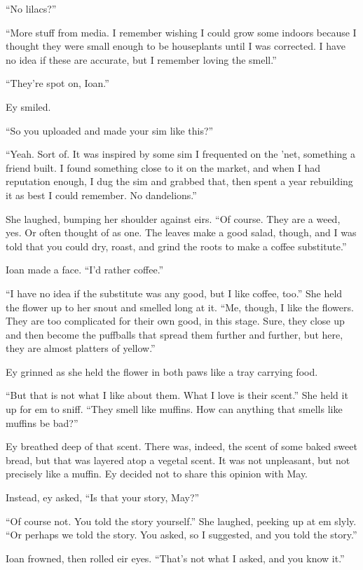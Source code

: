 ``No lilacs?''

``More stuff from media. I remember wishing I could grow some indoors because I thought they were small enough to be houseplants until I was corrected. I have no idea if these are accurate, but I remember loving the smell.''

``They're spot on, Ioan.''

Ey smiled.

``So you uploaded and made your sim like this?''

``Yeah. Sort of. It was inspired by some sim I frequented on the 'net, something a friend built. I found something close to it on the market, and when I had reputation enough, I dug the sim and grabbed that, then spent a year rebuilding it as best I could remember. No dandelions.''

She laughed, bumping her shoulder against eirs. ``Of course. They are a weed, yes. Or often thought of as one. The leaves make a good salad, though, and I was told that you could dry, roast, and grind the roots to make a coffee substitute.''

Ioan made a face. ``I'd rather coffee.''

``I have no idea if the substitute was any good, but I like coffee, too.'' She held the flower up to her snout and smelled long at it. ``Me, though, I like the flowers. They are too complicated for their own good, in this stage. Sure, they close up and then become the puffballs that spread them further and further, but here, they are almost platters of yellow.''

Ey grinned as she held the flower in both paws like a tray carrying food.

``But that is not what I like about them. What I love is their scent.'' She held it up for em to sniff. ``They smell like muffins. How can anything that smells like muffins be bad?''

Ey breathed deep of that scent. There was, indeed, the scent of some baked sweet bread, but that was layered atop a vegetal scent. It was not unpleasant, but not precisely like a muffin. Ey decided not to share this opinion with May.

Instead, ey asked, ``Is that your story, May?''

``Of course not. You told the story yourself.'' She laughed, peeking up at em slyly. ``Or perhaps we told the story. You asked, so I suggested, and you told the story.''

Ioan frowned, then rolled eir eyes. ``That's not what I asked, and you know it.''

